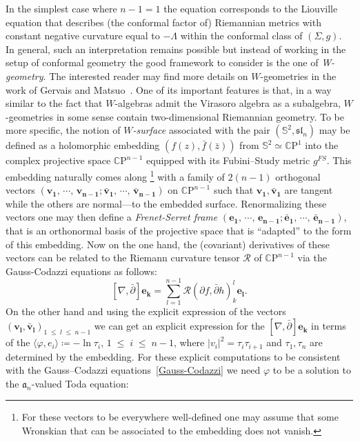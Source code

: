 \documentclass[AHL,Unicode,longabstracts,published]{cedram}
\renewcommand{\leq}{\;\leqslant\;}
\newcommand{\frksl}{\mathfrak{sl}}
\newcommand{\frka}{\mathfrak{a}}
\newcommand{\rmP}{\mathrm{P}}
\newcommand{\clR}{\mathcal{R}}
\newcommand{\C}{\mathbb{C}}
\renewcommand*\S{\mathbb{S}}
\newcommand{\ps}[1]{\langle #1 \rangle}
\newcommand{\norm}[1]{\left\lvert#1\right\rvert}
\begin{document}
In the simplest case where $n-1=1$ the equation corresponds to the Liouville equation that describes (the conformal factor of) Riemannian metrics with constant negative curvature equal to $-\Lambda$ within the conformal class of $(\Sigma,g)$. In general, such an interpretation remains possible but instead of working in the setup of conformal geometry the good framework to consider is the one of \emph{W-geometry}. The interested reader may find more details on $W$-geometries in the work of Gervais and Matsuo~\cite{GeMa92}. One of its important features is that, in a way similar to the fact that $W$-algebras admit the Virasoro algebra as a subalgebra, $W$-geometries in some sense contain two-dimensional Riemannian geometry. To be more specific, the notion of \emph{$W$-surface} associated with the pair $(\S^2,\frksl_n)$ may be defined as a holomorphic embedding $(f(z), \bar f(\bar z))$ from $\S^2\simeq \C \rmP^1$ into the complex projective space $\C \rmP^{n-1}$ equipped with its Fubini--Study metric $g^{FS}$. This embedding naturally comes along
\footnote{For these vectors to be everywhere well-defined one may assume that some Wronskian that can be associated to the embedding does not vanish.} with a family of $2(n-1)$ orthogonal vectors $(\bm{v_1},\,\cdots,\,\bm{v_{n-1}};\bm{\bar v_1},\,\cdots,\,\bm{\bar v_{n-1}})$ on $\C \rmP^{n-1}$ such that $\bm{v_1},\bm{\bar v_1}$ are tangent while the others are normal---to the embedded surface. Renormalizing these vectors one may then define a \emph{Frenet-Serret frame} $(\bm{e_1},\,\cdots,\,\bm{e_{n-1}};\bm{\bar e_1},\,\cdots,\,\bm{\bar e_{n-1}})$, that is an orthonormal basis of the projective space that is ``adapted'' to the form of this embedding. Now on the one hand, the (covariant) derivatives of these vectors can be related to the Riemann curvature tensor $\clR$ of $\C\rmP^{n-1}$ via the Gauss-Codazzi equations as follows:
\begin{equation}\label{Gauss-Codazzi}
\left[\nabla,\bar\partial\right]\bm{e_k}=\sum_{l=1}^{n-1}\clR\left(\partial f,\bar\partial h\right)_k^l\bm{e_l}.
\end{equation}
On the other hand and using the explicit expression of the vectors $(\bm{v_l},\bm{\bar v_l})_{1\leq l\leq n-1}$ we can get an explicit expression for the $[\nabla,\bar\partial]\bm{e_k}$ in terms of the $\ps{\varphi,e_i}\coloneqq -\ln\tau_i$, $1\leq i\leq n-1$, where $\norm{v_i}^2=\tau_i\tau_{i+1}$ and $\tau_1,\tau_{n}$ are determined by the embedding. For these explicit computations to be consistent with the Gauss--Codazzi equations~\eqref{Gauss-Codazzi} we need $\varphi$ to be a solution to the $\frka_n$-valued Toda equation:
\end{document}
